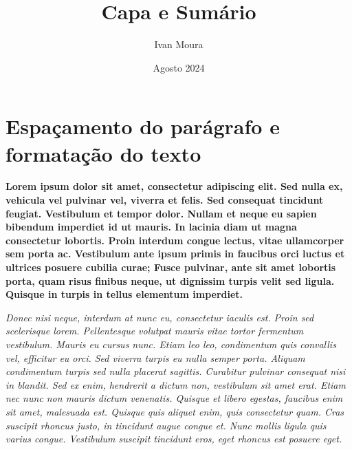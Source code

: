 \documentclass[12pt]{article}
\begin{document}
\title{Capa e Sumário}%
\author{Ivan Moura}%
\date{Agosto 2024}%
\maketitle %
\thispagestyle{empty} %
\newpage

\setcounter{page}{1} %
\tableofcontents %
\newpage

\listoffigures %
\newpage

\setcounter{page}{1} %

\section{Espaçamento do parágrafo e formatação do texto}


\onehalfspacing %

\textbf{
Lorem ipsum dolor sit amet, consectetur adipiscing elit. Sed nulla ex, vehicula vel pulvinar vel, viverra et felis. Sed consequat tincidunt feugiat. Vestibulum et tempor dolor. Nullam et neque eu sapien bibendum imperdiet id ut mauris. In lacinia diam ut magna consectetur lobortis. Proin interdum congue lectus, vitae ullamcorper sem porta ac. Vestibulum ante ipsum primis in faucibus orci luctus et ultrices posuere cubilia curae; Fusce pulvinar, ante sit amet lobortis porta, quam risus finibus neque, ut dignissim turpis velit sed ligula. Quisque in turpis in tellus elementum imperdiet.
}

\begin{doublespace} %

\textit{
	Donec nisi neque, interdum at nunc eu, consectetur iaculis est. Proin sed scelerisque lorem. Pellentesque volutpat mauris vitae tortor fermentum vestibulum. Mauris eu cursus nunc. Etiam leo leo, condimentum quis convallis vel, efficitur eu orci. Sed viverra turpis eu nulla semper porta. Aliquam condimentum turpis sed nulla placerat sagittis. Curabitur pulvinar consequat nisi in blandit. Sed ex enim, hendrerit a dictum non, vestibulum sit amet erat. Etiam nec nunc non mauris dictum venenatis. Quisque et libero egestas, faucibus enim sit amet, malesuada est. Quisque quis aliquet enim, quis consectetur quam. Cras suscipit rhoncus justo, in tincidunt augue congue et. Nunc mollis ligula quis varius congue. Vestibulum suscipit tincidunt eros, eget rhoncus est posuere eget.
}
\end{doublespace}
\end{document}

